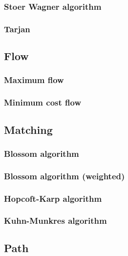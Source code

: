 \documentclass[titlepage,a4paper,10pt]{article}
\begin{document}
\begin{multicols}{2}
\begin{spacing}{0.8}
{				\subsubsection{Stoer Wagner algorithm}
					
				\subsubsection{Tarjan}
					
			\subsection{Flow}
				\subsubsection{Maximum flow}
					
				\subsubsection{Minimum cost flow}
					
			\subsection{Matching}
				
				\subsubsection{Blossom algorithm}
					
				\subsubsection{Blossom algorithm (weighted)}
					
				\subsubsection{Hopcoft-Karp algorithm}
					
				\subsubsection{Kuhn-Munkres algorithm}
					
			\subsection{Path}
}
\end{spacing}
\end{multicols}
\end{document}
